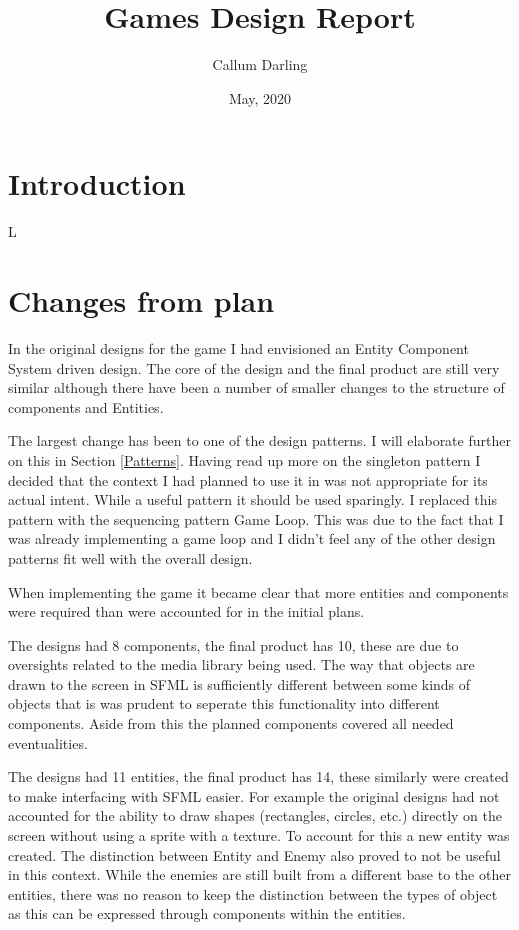 \documentclass{article}
\begin{document}
\title{Games Design Report}
\author{Callum Darling}
\date{May, 2020}
\maketitle
\parskip 0.2in

\section{Introduction}

L

\section{Changes from plan}\label{Changes}

In the original designs for the game I had envisioned an Entity Component System driven design.
The core of the design and the final product are still very similar although there have been a number of smaller changes to the structure of components and Entities.

The largest change has been to one of the design patterns. I will elaborate further on this in Section \ref{Patterns}. 
Having read up more on the singleton pattern I decided
that the context I had planned to use it in was not appropriate for its actual intent. While a useful pattern it should be used sparingly. 
I replaced this pattern with the sequencing pattern Game Loop.
This was due to the fact that I was already implementing a game loop and I didn't feel any of the other design patterns fit well with the overall design. 

When implementing the game it became clear that more entities and components were required than were accounted for in the initial plans. 

The designs had 8 components, the final product has 10, these are due to oversights related to the media library being used.
The way that objects are drawn to the screen in SFML is sufficiently different between some kinds of objects that is was prudent to seperate this functionality into different components.
Aside from this the planned components covered all needed eventualities.

The designs had 11 entities, the final product has 14, these similarly were created to make interfacing with SFML easier.
For example the original designs had not accounted for the ability to draw shapes (rectangles, circles, etc.) directly on the screen without using a sprite with a texture.
To account for this a new entity was created.
The distinction between Entity and Enemy also proved to not be useful in this context.
 While the enemies are still built from a different base to the other entities,
 there was no reason to keep the distinction between the types of object as this can be expressed through components within the entities.
\end{document}
